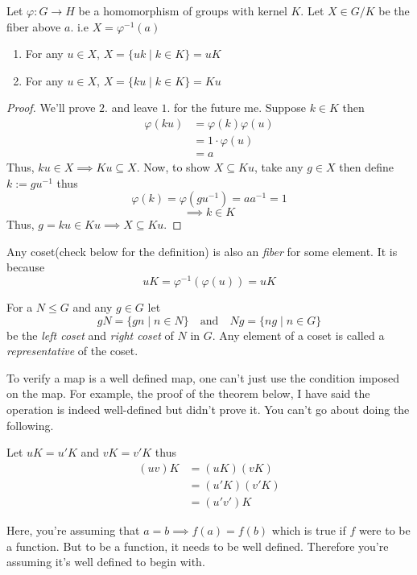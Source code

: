 \begin{proposition}
    Let $\varphi : G \to H$ be a homomorphism of groups with kernel $K$. Let $X \in G/K$ be the fiber above $a$. i.e 
    $X = \varphi^{-1}(a)$
    \begin{enumerate}
        \item For any $u \in X$, $X = \{u k \mid k \in K\} = uK$
        \item For any $u \in X$, $X=\{ku \mid k \in K\} = Ku$
    \end{enumerate}
\end{proposition}

\begin{proof}
    We'll prove $2.$ and leave $1.$ for the future me. Suppose $k \in K$ then 
    \begin{align*}
        \varphi(ku) &= \varphi(k) \varphi(u) \\
        &= 1 \cdot \varphi(u) \\
        &= a
    \end{align*}
    Thus, $ku \in X \implies Ku \subseteq X$. Now, to show $X \subseteq Ku$, take any $g \in X$ then define $k := gu^{-1}$ thus
    \[ \varphi(k)=\varphi(gu^{-1})=a a^{-1}=1 \]
    \[ \implies k \in K \]
    Thus, $g=ku \in Ku \implies X \subseteq Ku$. 
\end{proof}

\begin{remark}
    Any coset(check below for the definition) is also an \textit{fiber} for some element. It is because
    \[ uK = \varphi^{-1}(\varphi(u)) = uK\] 
\end{remark}


\begin{definition}
    For a $N \le G$ and any $g \in G$ let 
    \[ gN = \{ gn \mid n \in N\} \quad \text{and} \quad Ng = \{ ng \mid n \in G\} \]
    be the \textit{left coset} and \textit{right coset} of $N$ in $G$. Any element of a coset is called a \textit{representative} of the 
    coset.
\end{definition}

\begin{remark}
    To verify a map is a well defined map, one can't just use the condition imposed on the map. For example,
    the proof of the theorem below, I have said the operation is indeed well-defined but didn't prove it. You can't go about doing the 
    following.

    Let $uK=u'K$ and $vK=v'K$ thus
    \begin{align*}
        (uv)K &= (uK)(vK) \\
        &= (u'K)(v'K)\\
        &= (u'v')K
    \end{align*}

    Here, you're assuming that $a=b \implies f(a)=f(b)$ which is true if $f$ were to be a function. But to be a function, it needs to be 
    well defined. Therefore you're assuming it's well defined to begin with.
\end{remark}


